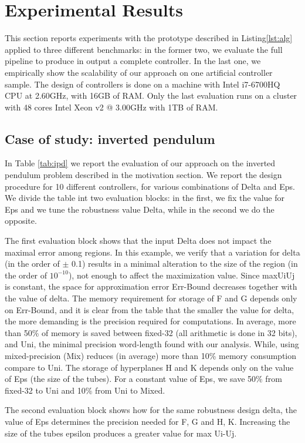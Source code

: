 \section{Experimental Results}
This section reports experiments with the prototype described in Listing\ref{lst:alg} applied to three different benchmarks: in the former two, we evaluate the full pipeline to produce in output a complete controller. In the last one, we empirically show the scalability of our approach on one artificial controller sample.
The design of controllers is done on a machine with Intel i7-6700HQ CPU at 2.60GHz, with 16GB of RAM. 
Only the last evaluation runs on a cluster with 48 cores Intel Xeon v2 @ 3.00GHz with 1TB of RAM.

\subsection{Case of study: inverted pendulum}
In Table \ref{tab:ipd} we report the evaluation of our approach on the inverted pendulum problem described in the motivation section. We report the design procedure for 10 different controllers, for various combinations of Delta and Eps. We divide the table int two evaluation blocks: in the first, we fix the value for Eps and we tune the robustness value Delta, while in the second we do the opposite.

The first evaluation block shows that the input Delta does not impact the maximal error among regions. In this example, we verify that a variation for delta (in the order of $\pm$ 0.1) results in a minimal alteration to the size of the region (in the order of $10^{-10}$), not enough to affect the maximization value. Since maxUiUj is constant, the space for approximation error Err-Bound decreases together with the value of delta. The memory requirement for storage of F and G depends only on Err-Bound, and it is clear from the table that the smaller the value for delta, the more demanding is the precision required for computations. In average, more than 50\% of memory is saved between fixed-32 (all arithmetic is done in 32 bits), and Uni, the minimal precision word-length found with our analysis. While, using mixed-precision (Mix) reduces (in average) more than 10\% memory consumption compare to Uni. The storage of hyperplanes H and K depends only on the value of Eps (the size of the tubes). For a constant value of Eps, we save 50\% from fixed-32 to Uni and 10\% from Uni to Mixed.

The second evaluation block shows how for the same robustness design delta, the value of Eps determines the precision needed for F, G and H, K. Increasing the size of the tubes epsilon produces a greater value for max Ui-Uj.
  
